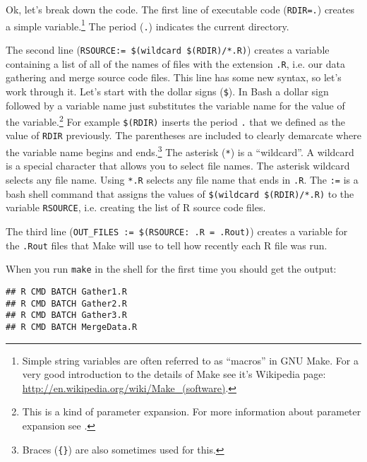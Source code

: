 Ok, let's break down the code. The first line of executable code (\texttt{RDIR=.}) creates a simple variable.\footnote{Simple string variables are often referred to as ``macros'' in GNU Make. For a very good introduction to the details of Make see it's Wikipedia page: \url{http://en.wikipedia.org/wiki/Make_(software)}.} The period (\texttt{.}) indicates the current directory. 

The second line (\verb|RSOURCE:= $(wildcard $(RDIR)/*.R)|) creates a variable containing a list of all of the names of files with the extension \texttt{.R}, i.e. our data gathering and merge source code files. This line has some new syntax, so let's work through it. Let's start with the dollar signs (\verb|$|). In Bash a dollar sign followed by a variable name just substitutes the variable name for the value of the variable.\footnote{This is a kind of parameter expansion. For more information about parameter expansion see \citep{Frazier2008}.} For example \verb|$(RDIR)| inserts the period \texttt{.} that we defined as the value of \texttt{RDIR} previously. The parentheses are included to clearly demarcate where the variable name begins and ends.\footnote{Braces (\texttt{\{\}}) are also sometimes used for this.} The asterisk (\verb|*|) is a ``wildcard''. A wildcard is a special character that allows you to select file names. The asterisk wildcard selects any file name. Using \verb|*.R| selects any file name that ends in \texttt{.R}.  The \texttt{:=} is a bash shell command that assigns the values of \verb|$(wildcard $(RDIR)/*.R)| to the variable \texttt{RSOURCE}, i.e. creating the list of R source code files.

The third line (\verb|OUT_FILES := $(RSOURCE: .R = .Rout)|) creates a variable for the \texttt{.Rout} files that Make will use to tell how recently each R file was run. 

When you run \verb|make| in the shell for the first time you should get the output:

\begin{knitrout}
	\color{fgcolor}
	\begin{kframe}
		\begin{verbatim}
## R CMD BATCH Gather1.R
## R CMD BATCH Gather2.R
## R CMD BATCH Gather3.R
## R CMD BATCH MergeData.R
			\end{verbatim}
		\end{kframe}
\end{knitrout}

